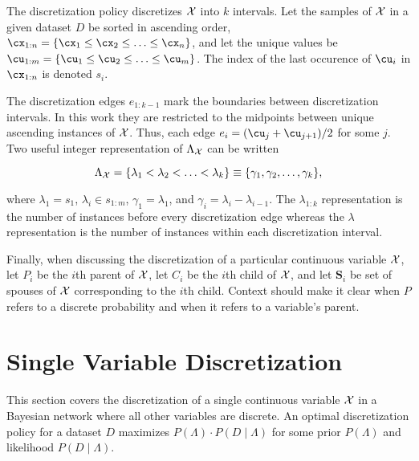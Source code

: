 \noindent
The discretization policy discretizes $\mathcal{X}$ into $k$ intervals.
Let the samples of $\mathcal{X}$ in a given dataset $D$ be sorted in ascending order, ${\cx_{1:n} = \curly{\cx_1 \leq \cx_2 \leq \ldots \leq \cx_n}}$, and let the unique values be ${\cu_{1:m} = \curly{\cu_1 \leq \cu_2 \leq \ldots \leq \cu_{m}}}$.
The index of the last occurence of $\cu_i$ in $\cx_{1:n}$ is denoted $s_i$.

The discretization edges $e_{1:k-1}$ mark the boundaries between discretization intervals.
In this work they are restricted to the midpoints between unique ascending instances of $\mathcal{X}$.
Thus, each edge $e_i = \paren{\cu_{j} + \cu_{{j+1}}}/2$ for some $j$.
Two useful integer representation of $\Lambda_{\mathcal{X}}$ can be written

\begin{equation}
\label{eq:disc_def}
  \Lambda_{\cX} = \curly{\lambda_1 < \lambda_2  < \ldots < \lambda_k} \equiv \curly{\gamma_1 , \gamma_2  , \ldots , \gamma_k}\text{,}
\end{equation}

\noindent
where $\lambda_1 = s_1$, $\lambda_i \in s_{1:m}$, $\gamma_1 = \lambda_1$, and $\gamma_i = \lambda_i - \lambda_{i-1}$.
The $\lambda_{1:k}$ representation is the number of instances before every discretization edge whereas the $\lambda$ representation is the number of instances within each discretization interval.

Finally, when discussing the discretization of a particular continuous variable $\mathcal{X}$, let $P_i$ be the $i$th parent of $\mathcal{X}$, let $C_i$ be the $i$th child of $\mathcal{X}$, and let $\bm{S}_i$ be set of spouses of $\mathcal{X}$ corresponding to the $i$th child.
Context should make it clear when $P$ refers to a discrete probability and when it refers to a variable's parent.


\section{Single Variable Discretization}
\label{sec:single_var}

This section covers the discretization of a single continuous variable $\mathcal{X}$ in a Bayesian network where all other variables are discrete.
An optimal discretization policy for a dataset $D$ maximizes $P(\Lambda)\cdot P(D\mid \Lambda)$ for some prior $P(\Lambda)$ and likelihood $P(D\mid \Lambda)$.

